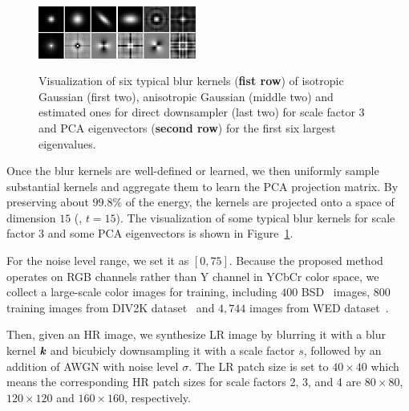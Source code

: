 \documentclass[10pt,twocolumn,letterpaper]{article}
\begin{document}
\begin{figure}[!t]\vspace{0.2cm}
  \begin{center}
  \includegraphics[width=0.463\textwidth]{kernel.png}\\
  \caption{Visualization of six typical blur kernels (\textbf{fist row}) of isotropic Gaussian (first two), anisotropic Gaussian (middle two) and estimated ones for direct downsampler (last two) for scale factor 3 and PCA eigenvectors (\textbf{second row}) for the first six largest eigenvalues.}\label{fig_kernel}
  \end{center}\vspace{-0.6cm}
\end{figure}

Once the blur kernels are well-defined or learned, we then uniformly sample substantial kernels and aggregate them to learn the PCA projection matrix.
By preserving about $99.8\%$ of the energy, the kernels are projected onto a space of dimension $15$ (\ie, $t = 15$).
The visualization of some typical blur kernels for scale factor 3 and some PCA eigenvectors is shown in Figure~\ref{fig_kernel}.









For the noise level range, we set it as $[0, 75]$.
Because the proposed method operates on RGB channels rather than Y channel in YCbCr color space, we collect a large-scale color images for training,
including $400$ BSD~\cite{MartinFTM01} images, $800$ training images from DIV2K dataset~\cite{agustsson2017ntire} and $4,744$ images from WED dataset~\cite{ma2016gmad}.


Then, given an HR image, we synthesize LR image by blurring it with a blur kernel $\emph{\textbf{k}}$ and bicubicly downsampling it with a scale factor $s$, followed by an addition of AWGN with noise level $\sigma$.
The LR patch size is set to $40\times 40$ which means the corresponding HR patch sizes for scale factors 2, 3, and 4 are $80\times 80$, $120\times 120$ and $160\times 160$, respectively.
\end{document}
